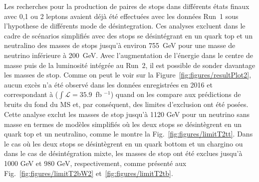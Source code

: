 Les recherches pour la production de paires de stops dans différents états finaux avec 0,1 ou 2 leptons avaient déjà été effectuées avec les données Run~1 sous l'hypothese de différents mode de désintegration. Ces analyses excluent dans le cadre de scénarios simplifiés avec des stops se désintégrant en un quark top et un neutralino des masses de stops jusqu'à environ 755~GeV pour une masse de neutrino inférieure à 200~GeV. Avec l'augmentation de l'énergie dans le centre de masse puis de la luminosité intégrée au Run~2, il est possible de sonder davantage les masses de stop. Comme on peut le voir sur la Figure~\ref{fig:figures/resultPlot2}, aucun excès n'a été observé dans les données enregistrées en 2016 et correspondant à ($ \int{\mathcal {L}} = 35.9 $~fb $^{-1} $) quand on les compare aux prédictions de bruits du fond du MS et, par conséquent, des limites d'exclusion ont été posées. Cette analyse exclut les masses de stop jusqu’à 1120 GeV pour un neutrino sans masse en termes de modèles simplifiés où les deux stops se désintègrent en un quark top et un neutralino, comme le montre la Fig.~\ref{fig:figures/limitT2tt}. Dans le cas où les deux stops se désintègrent en un quark bottom et un chargino ou dans le cas de désintégration mixte, les masses de stop ont été exclues jusqu’à 1000 GeV et 980 GeV, respectivement, comme présenté aux Fig.~\ref{fig:figures/limitT2bW2}  et~\ref{fig:figures/limitT2tb}.

